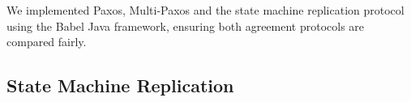 \documentclass[sigconf]{acmart}
\begin{document}







        


We implemented Paxos, Multi-Paxos and the state machine replication protocol using the Babel Java framework, ensuring both agreement protocols are compared fairly.

\subsection{State Machine Replication}

\end{document}
